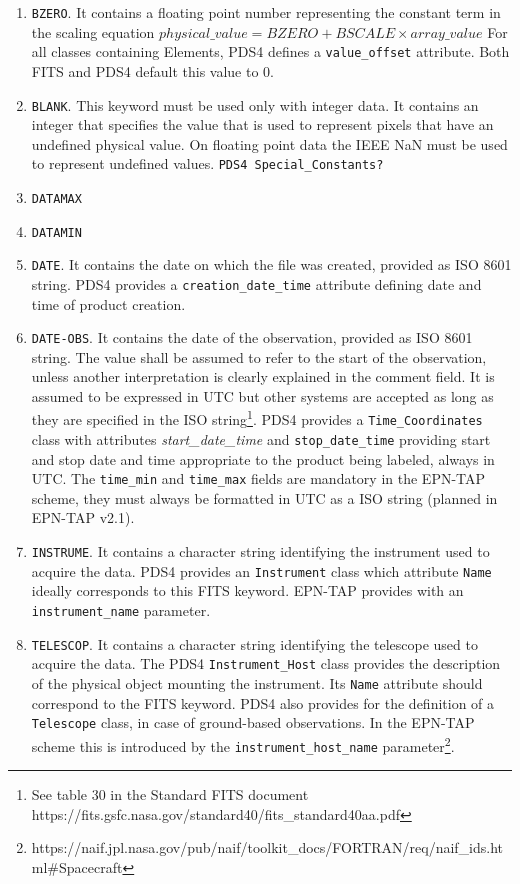 \begin{enumerate}
\item{\texttt{BZERO}.
It contains a floating point number representing the constant term in the
scaling equation $physical\_value = BZERO + BSCALE \times array\_value$
For all classes containing Elements, PDS4 defines a \texttt{value\_offset}
attribute. Both FITS and PDS4 default this value to $0$.}

\item{\texttt{BLANK}.
This keyword must be used only with integer data.
It contains an integer that specifies the value that is used to
represent pixels that have an undefined physical value.
On floating point data the IEEE NaN must be used to represent undefined values.  
\texttt{PDS4 Special\_Constants?}}

\item{\texttt{DATAMAX}}
\item{\texttt{DATAMIN}}

\item{\texttt{DATE}.
It contains the date on which the file was created, provided as ISO 8601
string.
PDS4 provides a \texttt{creation\_date\_time} attribute defining date
and time of product creation.}

\item{\texttt{DATE-OBS}.
It contains the date of the observation, provided as ISO 8601
string. The value shall be assumed to refer to the start of the observation,
unless another interpretation is clearly explained in the comment field.
It is assumed to be expressed in UTC but other systems are accepted as long as they
are specified in the ISO string\footnote{See table 30 in the Standard FITS document https://fits.gsfc.nasa.gov/standard40/fits\_standard40aa.pdf}. 
PDS4 provides a \texttt{Time\_Coordinates} class with attributes
\textit{start\_date\_time} and \texttt{stop\_date\_time} providing start and
stop date and time appropriate to the product being labeled, always in UTC.
The \texttt{time\_min} and \texttt{time\_max} fields are mandatory in the EPN-TAP scheme,
they must always be formatted in UTC as a ISO string (planned in EPN-TAP v2.1).}

\item{\texttt{INSTRUME}.
It contains a character string identifying the instrument used to acquire the data.
PDS4 provides an \texttt{Instrument} class which attribute \texttt{Name} ideally 
corresponds to this FITS keyword.
EPN-TAP provides with an \texttt{instrument\_name} parameter.}

\item{\texttt{TELESCOP}.
It contains a character string identifying the telescope used to acquire the data.
The PDS4 \texttt{Instrument\_Host} class provides the description of the physical object
mounting the instrument. Its \texttt{Name} attribute should correspond to the FITS keyword.
PDS4 also provides for the definition of a \texttt{Telescope} class, in case of
ground-based observations.
In the EPN-TAP scheme this is introduced by the \texttt{instrument\_host\_name}
parameter\footnote{https://naif.jpl.nasa.gov/pub/naif/toolkit\_docs/FORTRAN/req/naif\_ids.html\#Spacecraft}.}


\end{enumerate}
